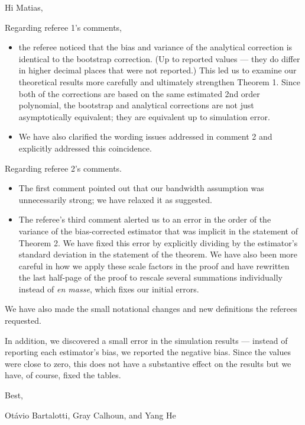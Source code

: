 \documentclass[12pt,fleqn]{article}
\begin{document}
\noindent%
Hi Matias,

\strut

Regarding referee 1's comments,
\begin{itemize}
\item the referee noticed that the bias and variance of the analytical
  correction is identical to the bootstrap correction. (Up to reported
  values --- they do differ in higher decimal places that were not
  reported.) This led us to examine our theoretical results more
  carefully and ultimately strengthen Theorem 1. Since both of the
  corrections are based on the same estimated 2nd order polynomial,
  the bootstrap and analytical corrections are not just asymptotically
  equivalent; they are equivalent up to simulation error.
\item We have also clarified the wording issues addressed in comment 2
  and explicitly addressed this coincidence.
\end{itemize}
Regarding referee 2's comments.
\begin{itemize}
\item The first comment pointed out that our bandwidth assumption was
  unnecessarily strong; we have relaxed it as suggested.
\item The referee's third comment alerted us to an error in the order
  of the variance of the bias-corrected estimator that was implicit in
  the statement of Theorem 2. We have fixed this error by explicitly
  dividing by the estimator's standard deviation in the statement of
  the theorem. We have also been more careful in how we apply these
  scale factors in the proof and have rewritten the last half-page
  of the proof to rescale several summations individually instead of
  \textit{en masse}, which fixes our initial errors.
\end{itemize}
We have also made the small notational changes and new definitions
the referees requested.

In addition, we discovered a small error in the simulation results ---
instead of reporting each estimator's bias, we reported the negative
bias. Since the values were close to zero, this does not have a
substantive effect on the results but we have, of course, fixed the
tables.

\noindent%
Best,

\noindent%
Ot\'avio Bartalotti, Gray Calhoun, and Yang He
\end{document}
